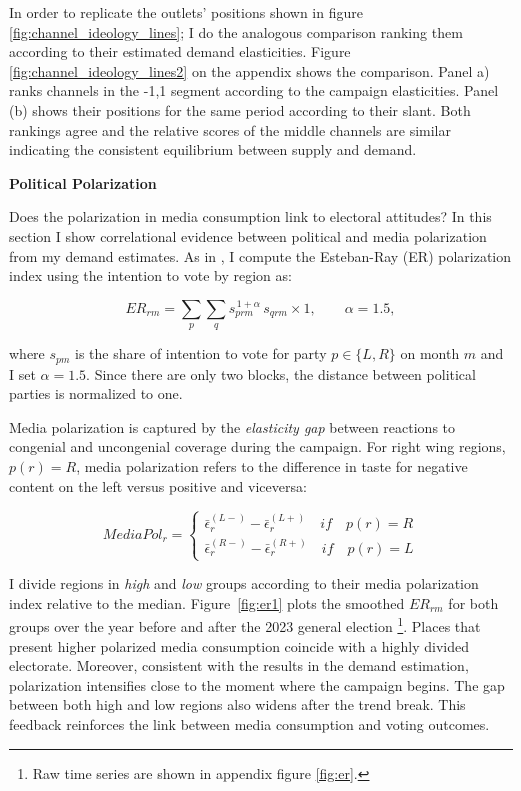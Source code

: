 \documentclass[12pt]{article}
\begin{document}
In order to replicate the outlets' positions shown in figure \ref{fig:channel_ideology_lines}; I do the analogous comparison ranking them according to their estimated demand elasticities. Figure \ref{fig:channel_ideology_lines2} on the appendix shows the comparison. Panel a) ranks channels in the -1,1 segment according to the campaign elasticities. Panel (b) shows their positions for the same period according to their slant. Both rankings agree and the relative scores of the middle channels are similar indicating the consistent equilibrium between supply and demand. 





	\textbf{Political Polarization}
	
	
	

Does the polarization in media consumption link to electoral attitudes?  In this section I show correlational evidence between political and media polarization from my demand estimates. As in \cite{martin2017}, I compute  the Esteban-Ray (ER) polarization index \citep{esteban} using the intention to vote by region as:

\begin{equation}
	ER_{rm}  =	 \sum_{p}   \sum_{q}
	s_{prm}^{\,1+\alpha}\,s_{qrm} \times 1,\qquad \alpha = 1.5,
		\label{eq:er}
\end{equation}

where $s_{pm}$ is the share of intention to vote for party $p\in \{L,R\}$  on month $m$ and I set $\alpha=1.5$. Since there are only two blocks, the distance between political parties is normalized to one. 


Media polarization is captured by the \emph{elasticity gap} between reactions to congenial and uncongenial coverage during the campaign. For right wing regions, $p(r)=R$, media polarization refers to the difference in taste for negative content on the left versus positive and viceversa: 


\begin{equation}
	MediaPol_r  =	\begin{cases}
		\bar{\epsilon}_r^{(L-)}- \bar{\epsilon}_r^{(L+)} \quad if \quad p(r)=R\\
		\bar{\epsilon}_r^{(R-)}- \bar{\epsilon}_r^{(R+)} \quad if \quad p(r)=L
	\end{cases}
		\label{eq:mediapol}
\end{equation}


I divide regions in \textit{high} and \textit{low} groups according to their media polarization index relative to the median. Figure~\ref{fig:er1} plots the smoothed  \(ER_{rm}\)
for both groups over the year before and after the 2023 general election \footnote{Raw time series are shown in appendix figure \ref{fig:er}.}. Places that present higher polarized media consumption coincide with a highly divided electorate. Moreover, consistent with the results in the demand estimation, polarization intensifies close to the moment where the campaign begins. The gap between both high and low regions also widens after the trend break. This feedback reinforces the link between media consumption and voting outcomes. 
\end{document}
